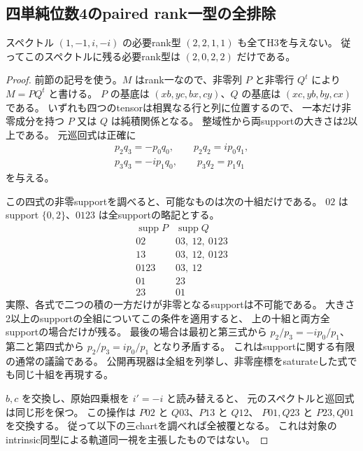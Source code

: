 \subsection{四単純位数4のpaired rank一型の全排除}
\label{subsec:cubic-four-simple-order4-rankA}
\begin{theorem}[二つ目のrank型の完成]
\label{thm:cubic-four-simple-order4-rankA-empty}
スペクトル $(1,-1,i,-i)$ の必要rank型 $(2,2,1,1)$ も全てH3を与えない。
従ってこのスペクトルに残る必要rank型は $(2,0,2,2)$ だけである。
\end{theorem}
\begin{proof}
前節の記号を使う。$M$ はrank一なので、非零列 $P$ と非零行 $Q^t$ により
$M=PQ^t$ と書ける。
$P$ の基底は $(xb,yc,bx,cy)$、$Q$ の基底は $(xc,yb,by,cx)$ である。
いずれも四つのtensorは相異なる行と列に位置するので、
一本だけ非零成分を持つ $P$ 又は $Q$ は純積関係となる。
整域性から両supportの大きさは2以上である。
元巡回式は正確に
\begin{gather*}
 p_2q_3=-p_0q_0,\qquad p_2q_2=ip_0q_1,\\
 p_3q_3=-ip_1q_0,\qquad p_3q_2=p_1q_1
\end{gather*}
を与える。

この四式の非零supportを調べると、可能なものは次の十組だけである。
$02$ はsupport $\{0,2\}$、$0123$ は全supportの略記とする。
\[
\begin{array}{c|c}
 \operatorname{supp}P&\operatorname{supp}Q\\\hline
 02&03,\ 12,\ 0123\\
 13&03,\ 12,\ 0123\\
 0123&03,\ 12\\
 01&23\\
 23&01
\end{array}
\]
実際、各式で二つの積の一方だけが非零となるsupportは不可能である。
大きさ2以上のsupportの全組についてこの条件を適用すると、
上の十組と両方全supportの場合だけが残る。
最後の場合は最初と第三式から $p_2/p_3=-ip_0/p_1$、
第二と第四式から $p_2/p_3=ip_0/p_1$ となり矛盾する。
これはsupportに関する有限の通常の議論である。
公開再現器は全組を列挙し、非零座標をsaturateした式でも同じ十組を再現する。

$b,c$ を交換し、原始四乗根を $i'=-i$ と読み替えると、
元のスペクトルと巡回式は同じ形を保つ。
この操作は $P02$ と $Q03$、$P13$ と $Q12$、
$P01,Q23$ と $P23,Q01$ を交換する。
従って以下の三chartを調べれば全被覆となる。
これは対象のintrinsic同型による軌道同一視を主張したものではない。


\end{proof}
